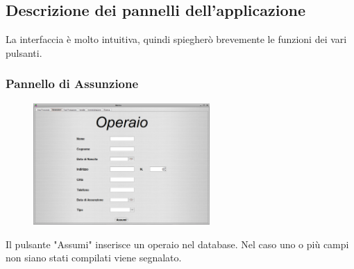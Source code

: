 \documentclass{article}
\begin{document}
\subsection{Descrizione dei pannelli dell'applicazione}
La interfaccia è molto intuitiva, quindi spiegherò brevemente le funzioni dei vari pulsanti.
\subsubsection{Pannello di Assunzione}
\begin{figure}[htbp]
\centering
\includegraphics[width=0.6\textwidth]{img/panel_assunzioni.png}
\end{figure}
Il pulsante "Assumi" inserisce un operaio nel database. Nel caso uno o più campi non siano stati compilati viene segnalato.
\end{document}

